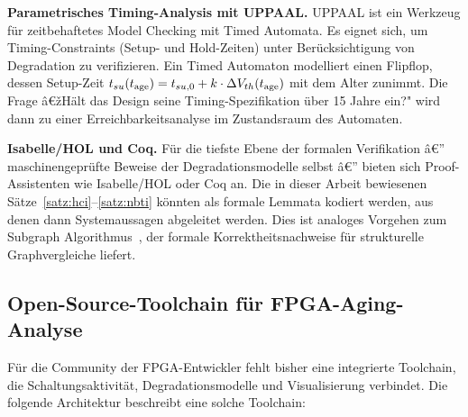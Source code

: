 ﻿\documentclass[a4paper,12pt]{article}
\theoremstyle{definition}
\begin{document}
\textbf{Parametrisches Timing-Analysis mit UPPAAL.}
UPPAAL ist ein Werkzeug für zeitbehaftetes Model Checking mit Timed Automata.
Es eignet sich, um Timing-Constraints (Setup- und Hold-Zeiten) unter Berücksichtigung
von Degradation zu verifizieren. Ein Timed Automaton modelliert einen Flipflop,
dessen Setup-Zeit $t_{su}(t_{\rm age}) = t_{su,0} + k \cdot \Delta V_{th}(t_{\rm age})$
mit dem Alter zunimmt. Die Frage â€žHält das Design seine Timing-Spezifikation über
15 Jahre ein?" wird dann zu einer Erreichbarkeitsanalyse im Zustandsraum des Automaten.

\textbf{Isabelle/HOL und Coq.}
Für die tiefste Ebene der formalen Verifikation â€” maschinengeprüfte Beweise der
Degradationsmodelle selbst â€” bieten sich Proof-Assistenten wie Isabelle/HOL
oder Coq an. Die in dieser Arbeit bewiesenen Sätze~\ref{satz:hci}--\ref{satz:nbti}
könnten als formale Lemmata kodiert werden, aus denen dann Systemaussagen
abgeleitet werden. Dies ist analoges Vorgehen zum Subgraph Algorithmus~\cite{epp2026},
der formale Korrektheitsnachweise für strukturelle Graphvergleiche liefert.

\subsection{Open-Source-Toolchain für FPGA-Aging-Analyse}
\label{sub:toolchain}

Für die Community der FPGA-Entwickler fehlt bisher eine integrierte Toolchain,
die Schaltungsaktivität, Degradationsmodelle und Visualisierung verbindet.
Die folgende Architektur beschreibt eine solche Toolchain:
\end{document}
